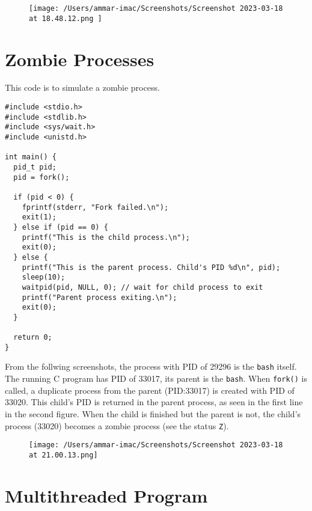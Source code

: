 \documentclass{article}
\def\c#1{\texttt{#1}}
\begin{document}
\begin{figure}[ht]
	\centering
	\texttt{[image: /Users/ammar-imac/Screenshots/Screenshot 2023-03-18 at 18.48.12.png ]}
\end{figure}

\section{Zombie Processes}%
This code is to simulate a zombie process.

\begin{lstlisting}[style=cstyle]
#include <stdio.h>
#include <stdlib.h>
#include <sys/wait.h>
#include <unistd.h>

int main() {
  pid_t pid;
  pid = fork();

  if (pid < 0) {
    fprintf(stderr, "Fork failed.\n");
    exit(1);
  } else if (pid == 0) {
    printf("This is the child process.\n");
    exit(0);
  } else {
    printf("This is the parent process. Child's PID %d\n", pid);
    sleep(10);
    waitpid(pid, NULL, 0); // wait for child process to exit
    printf("Parent process exiting.\n");
    exit(0);
  }

  return 0;
}
\end{lstlisting}


\newpage

From the follwing screenshots, the process with PID of 29296 is the \c{bash} itself.
The running C program has PID of 33017, its parent is the \c{bash}. When \c{fork()} is called,
a duplicate process from the parent (PID:33017) is created with PID of 33020. This child's PID is returned
in the parent process, as seen in the first line in the second figure. When the child is finished but
the parent is not, the child's process (33020) becomes a zombie process (see the status \c{Z}).

\begin{figure}[ht]
	\centering
	\texttt{[image: /Users/ammar-imac/Screenshots/Screenshot 2023-03-18 at 21.00.13.png]}
\end{figure}


\section{Multithreaded Program}%
\end{document}
